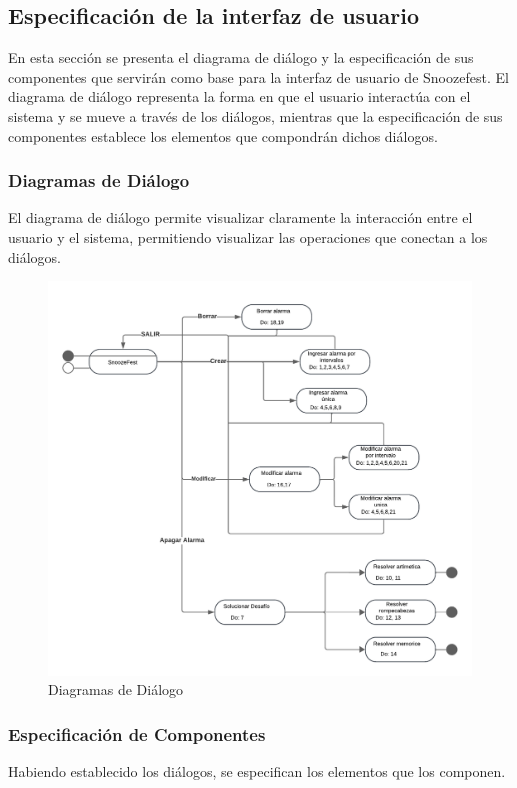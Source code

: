 \subsection{Especificación de la interfaz de usuario}
En esta sección se presenta el diagrama de diálogo y la especificación de sus componentes que servirán como base para la interfaz de usuario de Snoozefest. El diagrama de diálogo representa la forma en que el usuario interactúa con el sistema y se mueve a través de los diálogos, mientras que la especificación de sus componentes establece los elementos que compondrán dichos diálogos.

\subsubsection{Diagramas de Diálogo}
El diagrama de diálogo permite visualizar claramente la interacción entre el usuario y el sistema, permitiendo visualizar las operaciones que conectan a los diálogos.
\begin{figure}[H]
	\centering
	\includegraphics[page=1,width=\textwidth]{./img/dialogos.pdf}
	\caption{Diagramas de Diálogo}
        \vspace{10pt}
	\label{fig:Diagrama de Diálogos}
\end{figure}

\subsubsection{Especificación de Componentes}
Habiendo establecido los diálogos, se especifican los elementos que los componen.

